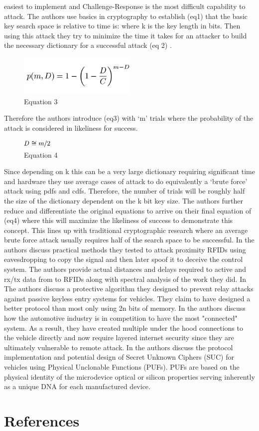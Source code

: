 \documentclass[conference]{journal}
\begin{document}
easiest to implement and Challenge-Response is the most difficult capability to attack. The authors use basics in cryptography to establish (eq1) that the basic key search space is relative to time is:  where k is the key length in bits. Then using this attack they try to minimize the time it takes for an attacker to build the necessary dictionary for a successful attack (eq 2)  . 
\begin{figure}
\centering
\includegraphics[width=0.5\textwidth]{Equation3.png}
\caption{\label{fig:Equation3} Equation 3}
\end{figure}
   Therefore the authors introduce (eq3) with ‘m’ trials where the probability of the attack is considered in likeliness for success.  
\begin{figure}
\centering
\includegraphics[width=0.125\textwidth]{Equation4.png}
\caption{\label{fig:Equation4} Equation 4}
\end{figure}
Since depending on k this can be a very large dictionary requiring significant time and hardware they use average cases of attack to do equivalently a ‘brute force’ attack using pdfs and cdfs. Therefore, the number of trials will be roughly half the size of the dictionary dependent on the k bit key size. The authors further reduce and differentiate the original equations to arrive on their final equation of (eq4) where this will maximize the likeliness of success to demonstrate this concept. This lines up with traditional cryptographic research where an average brute force attack usually requires half of the search space to be successful. 
In \cite{1624023} the authors discuss practical methods they tested to attack proximity RFIDs using eavesdropping to copy the signal and then later spoof it to deceive the control system. The authors provide actual distances and delays required to active and rx/tx data from to RFIDs along with spectral analysis of the work they did. In \cite{6234155} The authors discuss a protective algorithm they designed to prevent relay attacks against passive keyless entry systems for vehicles. They claim to have designed a better protocol than most only using 2n bits of memory. In \cite{7223297} the authors discuss how the automotive industry is in competition to have the most "connected" system. As a result, they have created multiple under the hood connections to the vehicle directly and now require layered internet security since they are ultimately vulnerable to remote attack. In \cite{7991092} the authors discuss the protocol implementation and potential design of Secret Unknown Ciphers (SUC) for vehicles using Physical Unclonable Functions (PUFs). PUFs are based on the physical identity of the microdevice optical or silicon properties serving inherently as a unique DNA for each manufactured device.

\section{References}




\end{document}
